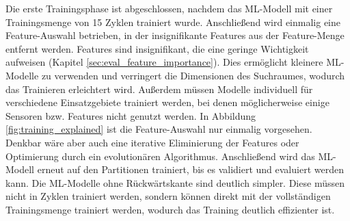 \newline
\newline
Die erste Trainingsphase ist abgeschlossen, nachdem das ML-Modell mit einer Trainingsmenge von 15 Zyklen trainiert wurde.
Anschließend wird einmalig eine Feature-Auswahl betrieben, in der insignifikante Features aus der Feature-Menge entfernt werden.
Features sind insignifikant, die eine geringe Wichtigkeit aufweisen (Kapitel \ref{sec:eval_feature_importance}).
Dies ermöglicht kleinere ML-Modelle zu verwenden und verringert die Dimensionen des Suchraumes, wodurch das Trainieren erleichtert wird.
Außerdem müssen Modelle individuell für verschiedene Einsatzgebiete trainiert werden, bei denen möglicherweise einige Sensoren bzw. Features nicht genutzt werden.
In Abbildung \ref{fig:training_explained} ist die Feature-Auswahl nur einmalig vorgesehen.
Denkbar wäre aber auch eine iterative Eliminierung der Features oder Optimierung durch ein evolutionären Algorithmus.
Anschließend wird das ML-Modell erneut auf den Partitionen trainiert, bis es validiert und evaluiert werden kann.
\newline
\newline
Die ML-Modelle ohne Rückwärtskante sind deutlich simpler.
Diese müssen nicht in Zyklen trainiert werden, sondern können direkt mit der vollständigen Trainingsmenge trainiert werden,
wodurch das Training deutlich effizienter ist.